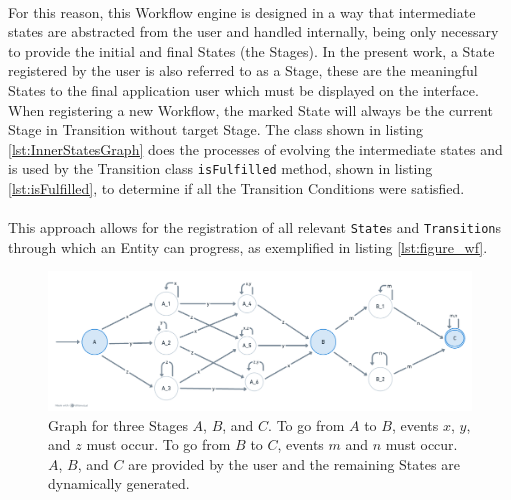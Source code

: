 \paragraph{} For this reason, this Workflow engine is designed in a way that intermediate states are abstracted from the user and handled internally, being only necessary to provide the initial and final States (the Stages). In the present work, a State registered by the user is also referred to as a Stage, these are the meaningful States to the final application user which must be displayed on the interface. When registering a new Workflow, the marked State will always be the current Stage in Transition without target Stage. The class shown in listing \ref{lst:InnerStatesGraph} does the processes of evolving the intermediate states and is used by the Transition class \verb|isFulfilled| method, shown in listing \ref{lst:isFulfilled}, to determine if all the Transition Conditions were satisfied. 

\paragraph{} This approach allows for the registration of all relevant \verb|State|s and \verb|Transition|s through which an Entity can progress, as exemplified in listing \ref{lst:figure_wf}.

\begin{figure} [H]
    \centering
    \includegraphics[width=1\linewidth]{figuras/abc_graph.png}
    \caption{Graph for three Stages $A$, $B$, and $C$. To go from $A$ to $B$, events $x$, $y$, and $z$ must occur. To go from $B$ to $C$, events $m$ and $n$ must occur. $A$, $B$, and $C$ are provided by the user and the remaining States are dynamically generated.}
    \label{fig:abc_graph}
\end{figure}

